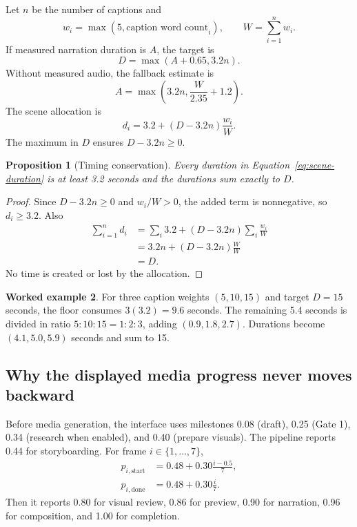 \documentclass[11pt]{article}
\theoremstyle{plain}
\newtheorem{proposition}{Proposition}[section]
\theoremstyle{definition}
\newtheorem{workedexample}[proposition]{Worked example}
\begin{document}
Let $n$ be the number of captions and
\[
w_i=\max(5,\text{caption word count}_i),\qquad W=\sum_{i=1}^nw_i.
\]
If measured narration duration is $A$, the target is
\[
D=\max(A+0.65,3.2n).
\]
Without measured audio, the fallback estimate is
\[
A=\max\left(3.2n,\frac{W}{2.35}+1.2\right).
\]
The scene allocation is
\begin{equation}
d_i=3.2+(D-3.2n)\frac{w_i}{W}.
\label{eq:scene-duration}
\end{equation}
The maximum in $D$ ensures $D-3.2n\ge0$.

\begin{proposition}[Timing conservation]
\label{prop:timing}
Every duration in Equation~\eqref{eq:scene-duration} is at least 3.2 seconds and the durations sum exactly to $D$.
\end{proposition}

\begin{proof}
Since $D-3.2n\ge0$ and $w_i/W>0$, the added term is nonnegative, so $d_i\ge3.2$. Also
\begin{align*}
\sum_{i=1}^nd_i
&=\sum_i3.2+(D-3.2n)\sum_i\frac{w_i}{W}\\
&=3.2n+(D-3.2n)\frac{W}{W}\\
&=D.
\end{align*}
No time is created or lost by the allocation.
\end{proof}

\begin{workedexample}
For three caption weights $(5,10,15)$ and target $D=15$ seconds, the floor consumes $3(3.2)=9.6$ seconds. The remaining 5.4 seconds is divided in ratio $5:10:15=1:2:3$, adding $(0.9,1.8,2.7)$. Durations become $(4.1,5.0,5.9)$ seconds and sum to 15.
\end{workedexample}

\subsection{Why the displayed media progress never moves backward}
\label{app:progress}

Before media generation, the interface uses milestones 0.08 (draft), 0.25 (Gate 1), 0.34 (research when enabled), and 0.40 (prepare visuals). The pipeline reports 0.44 for storyboarding. For frame $i\in\{1,\ldots,7\}$,
\begin{align}
p_{i,\mathrm{start}}&=0.48+0.30\frac{i-0.5}{7},\\
p_{i,\mathrm{done}}&=0.48+0.30\frac{i}{7}.
\end{align}
Then it reports 0.80 for visual review, 0.86 for preview, 0.90 for narration, 0.96 for composition, and 1.00 for completion.
\end{document}
